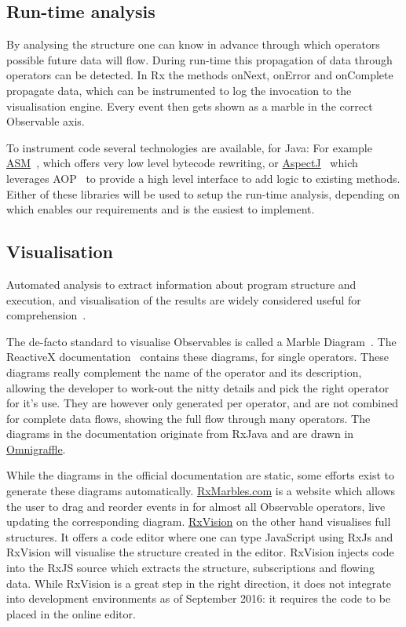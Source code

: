 \subsection{Run-time analysis} By analysing the structure one can know
in advance through which operators possible future data will flow.
During run-time this propagation of data through operators can be
detected.  In Rx the methods onNext, onError and onComplete propagate
data, which can be instrumented to log the invocation to the
visualisation engine.  Every event then gets shown as a marble in the
correct Observable axis.

To instrument code several technologies are available, for Java:  For
example \href{http://asm.ow2.org}{ASM}~\cite{bruneton2002asm,
kuleshov2007using}, which offers very low level bytecode rewriting, or
\href{http://www.eclipse.org/aspectj/}{AspectJ}~\cite{kiczales2001overview}
which leverages AOP~\cite{kiczales1997aspect} to provide a high level
interface to add logic to existing methods.  Either of these libraries
will be used to setup the run-time analysis, depending on which enables
our requirements and is the easiest to implement.

\subsection{Visualisation}%
Automated analysis to extract information about program structure and
execution, and visualisation of the results are widely considered useful
for comprehension~\cite{weck2016visualizing,quante2008dynamic}.

The de-facto standard to visualise Observables is called a Marble
Diagram~\cite{c9_marblediagrams}.  The ReactiveX documentation~\cite{reactivex}
contains these diagrams, for single operators.  These diagrams really
complement the name of the operator and its description, allowing the
developer to work-out the nitty details and pick the right operator for
it's use.  They are however only generated per operator, and are not
combined for complete data flows, showing the full flow through many
operators.  The diagrams in the documentation originate from RxJava and
are drawn in \href{https://www.omnigroup.com/omnigraffle} {Omnigraffle}.

While the diagrams in the official documentation are static, some
efforts exist to generate these diagrams automatically.  \href{http://RxMarbles.com}
{RxMarbles.com} is a website which allows the user to drag and reorder
events in for almost all Observable operators, live updating the
corresponding diagram.  \href{https://github.com/jaredly/rxvision}{RxVision}
on the other hand visualises full structures.  It offers a code editor
where one can type JavaScript using RxJs and RxVision will visualise the
structure created in the editor.  RxVision injects code into the RxJS
source which extracts the structure, subscriptions and flowing data.
While RxVision is a great step in the right direction, it does not
integrate into development environments as of September 2016:  it
requires the code to be placed in the online editor.

